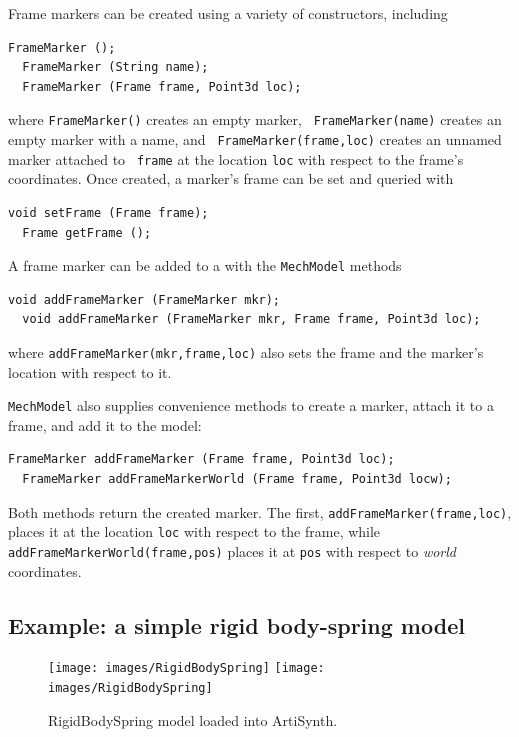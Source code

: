 Frame markers can be created using a variety of constructors, including
%
\begin{lstlisting}[]
  FrameMarker ();
  FrameMarker (String name);
  FrameMarker (Frame frame, Point3d loc);
\end{lstlisting}
%
where {\tt FrameMarker()} creates an empty marker, {\tt
FrameMarker(name)} creates an empty marker with a name, and {\tt
FrameMarker(frame,loc)} creates an unnamed marker attached to {\tt
frame} at the location {\tt loc} with respect to the frame's
coordinates. Once created, a marker's frame can be set and queried
with
%
\begin{lstlisting}[]
  void setFrame (Frame frame);
  Frame getFrame (); 
\end{lstlisting}
%
A frame marker can be added to a  with the
{\tt MechModel} methods
%
\begin{lstlisting}[]
  void addFrameMarker (FrameMarker mkr);
  void addFrameMarker (FrameMarker mkr, Frame frame, Point3d loc);
\end{lstlisting}
%
where {\tt addFrameMarker(mkr,frame,loc)} also sets the frame and the
marker's location with respect to it. 

{\tt MechModel} also supplies convenience methods to create a
marker, attach it to a frame, and add it to the model:
%
\begin{lstlisting}[]
  FrameMarker addFrameMarker (Frame frame, Point3d loc);
  FrameMarker addFrameMarkerWorld (Frame frame, Point3d locw);
\end{lstlisting}
%
Both methods return the created marker. 
The first, {\tt addFrameMarker(frame,loc)}, places it at the
location {\tt loc} with respect to the frame, while {\tt
addFrameMarkerWorld(frame,pos)} places it at {\tt pos} with respect to
{\it world} coordinates.

\subsection{Example: a simple rigid body-spring model}
\label{RigidBodySpringExample:sec}

\begin{figure}[ht]
\begin{center}
\iflatexml
 \texttt{[image: images/RigidBodySpring]}
\else
 \texttt{[image: images/RigidBodySpring]}
\fi
\end{center}
\caption{RigidBodySpring model loaded into ArtiSynth.}
\label{RigidBodySpring:fig}
\end{figure}

